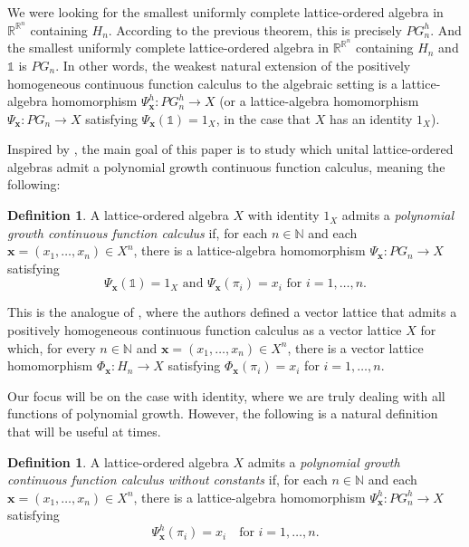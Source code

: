 \documentclass{amsart}
\theoremstyle{plain}
\theoremstyle{definition}
\newtheorem{defn}[thm]{Definition}
\theoremstyle{remark}
\newcommand\N{\ensuremath{\mathbb{N}}}
\newcommand\R{\ensuremath{\mathbb{R}}}
\newcommand{\one}{\mathbb{1}}
\newcommand{\Phx}{\Phi_{\bm x}}
\newcommand{\Psx}{\Psi_{\bm x}}
\begin{document}
We were looking for the smallest uniformly complete lattice-ordered
algebra in $\R^{\R^{n}}$ containing $H_n$. According to the previous
theorem, this is precisely $PG_n^{h}$.
And the smallest uniformly complete lattice-ordered algebra in
$\R^{\R^{n}}$ containing $H_n$ and $\one$ is $PG_n$. In other words,
the weakest natural extension of the positively homogeneous
continuous function calculus to the algebraic setting is a
lattice-algebra homomorphism $\Psx^{h}\colon PG_n^{h}\to X$ (or a
lattice-algebra homomorphism $\Psx\colon PG_n\to X$ satisfying
$\Psx(\one)=1_X$, in the case that
$X$ has an identity $1_X$).

Inspired by \cite{laustsen_troitsky2020},
the main goal of this paper is to study which unital
lattice-ordered algebras admit a polynomial growth continuous
function calculus, meaning the following:

\begin{defn}
    A lattice-ordered algebra $X$ with identity $1_X$ admits a \emph{polynomial
    growth continuous function calculus} if, for each $n \in \N$ and
    each $\bm x=(x_1,\ldots ,x_n)\in X^{n}$, there is a
    lattice-algebra homomorphism $\Psx\colon PG_n\to X$ satisfying
    \begin{equation}\label{eq:proj_one}
            \Psx(\one)=1_X \text{ and }
\Psx(\pi _i)=x_i\text{ for }i=1,\ldots ,n.
    \end{equation}
\end{defn}

This is the analogue of \cite[Definition 1.1]{laustsen_troitsky2020},
where the authors defined a vector lattice
that admits a positively homogeneous continuous function calculus
as a vector lattice $X$ for which, for every $n \in \N$ and $\bm
x=(x_1,\ldots ,x_n)\in X^{n}$, there is a vector lattice homomorphism
$\Phx\colon H_n\to X$ satisfying $\Phx(\pi _i)=x_i$ for $i=1,\ldots ,n$.

Our focus will be on the case with identity, where we are truly dealing with
all functions of polynomial growth. However, the following is a
natural definition that will be useful at times.

\begin{defn}
    A lattice-ordered algebra $X$ admits a \emph{polynomial
    growth continuous function calculus without constants} if, for each $n \in \N$ and
    each $\bm x=(x_1,\ldots ,x_n)\in X^{n}$, there is a
    lattice-algebra homomorphism $\Psx^{h}\colon PG_n^{h}\to X$ satisfying
    \begin{equation}\label{eq:proj}
    \Psx^{h}(\pi _i)=x_i\quad\text{for }i=1,\ldots ,n.
    \end{equation}
\end{defn}
\end{document}
